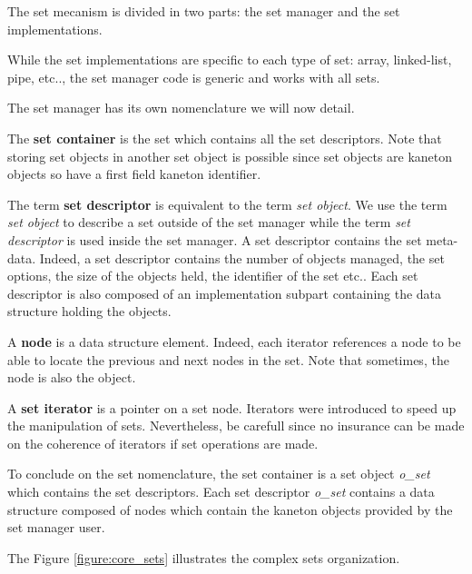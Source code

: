The set mecanism is divided in two parts: the set manager and the set
implementations.

While the set implementations are specific to each type of set: array,
linked-list, pipe, etc.., the set manager code is generic and works with all
sets.

The set manager has its own nomenclature we will now detail.

The \textbf{set container} is the set which contains all the set descriptors.
Note that storing set objects in another set object is possible since
set objects are kaneton objects so have a first field kaneton identifier.

The term \textbf{set descriptor} is equivalent to the term \textit{set object}.
We use the term \textit{set object} to describe a set outside of the set
manager while the term \textit{set descriptor} is used inside the set
manager. A set descriptor contains the set meta-data. Indeed, a set descriptor
contains the number of objects managed, the set options, the size of the
objects held, the identifier of the set etc.. Each set descriptor is also
composed of an implementation subpart containing the data structure holding
the objects.

A \textbf{node} is a data structure element. Indeed, each iterator
references a node to be able to locate the previous and next nodes in
the set. Note that sometimes, the node is also the object.

A \textbf{set iterator} is a pointer on a set node. Iterators were
introduced to speed up the manipulation of sets. Nevertheless, be carefull
since no insurance can be made on the coherence of iterators if set
operations are made.

To conclude on the set nomenclature, the set container is a set object
\textit{o\_set} which contains the set descriptors. Each set descriptor
\textit{o\_set} contains a data structure composed of nodes which
contain the kaneton objects provided by the set manager user.

The Figure \ref{figure:core_sets} illustrates the complex sets organization.

